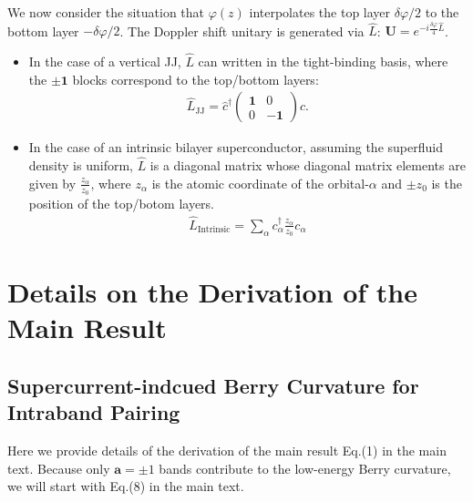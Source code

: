 \begin{subappendices}
We now consider the situation that $\varphi(z)$ interpolates the top layer $\delta\varphi/2$ to the bottom layer $-\delta\varphi/2$. The Doppler shift unitary is generated via $\hat L$: $\mathbf U=e^{-i\frac{\delta\varphi}{4} \hat L}$. 
\begin{itemize}
	\item In the case of a vertical JJ, $\hat L$ can written in the tight-binding basis, where the $\pm\mathbf 1$ blocks correspond to the top/bottom layers:
	\begin{align}
		\hat L_{\text{JJ}}=\hat c^\dagger \begin{pmatrix} \mathbf{1}&0\\0&\mathbf{-1}\end{pmatrix} c.
	\end{align} 
	\item In the case of an intrinsic bilayer superconductor, assuming the superfluid density is uniform, $\hat L$ is a diagonal matrix whose diagonal matrix elements are given by $\frac{z_\alpha}{z_0}$, where $z_\alpha$ is the atomic coordinate of the orbital-$\alpha$ and $\pm z_0$ is the position of the top/botom layers.
	\begin{align}
		\hat L_{\text{Intrinsic}}=\sum_\alpha c_\alpha^\dagger \frac{z_\alpha}{z_0} c_\alpha
	\end{align}
\end{itemize} 


\section{Details on the Derivation of the Main Result} \label{app:Derivation_Details}

\subsection{Supercurrent-indcued Berry Curvature for Intraband Pairing}
Here we provide details of the derivation of the main result Eq.(1) in the main text. Because only $\mathbf a=\pm 1$ bands contribute to the low-energy Berry curvature, we will start with Eq.(8) in the main text.


\end{subappendices}

